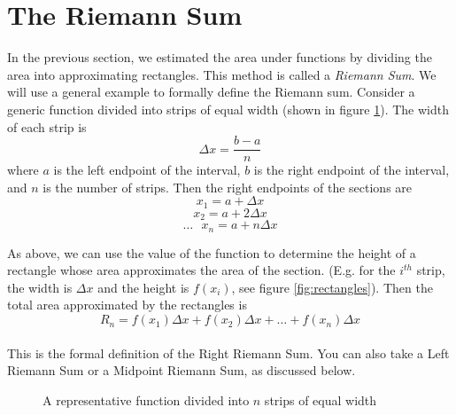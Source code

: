\section{The Riemann Sum}
In the previous section, we estimated the area under functions by dividing the area into approximating rectangles. This method is called a \textit{Riemann Sum}. We will use a general example to formally define the Riemann sum. Consider a generic function divided into strips of equal width (shown in figure \ref{fig:strips}). The width of each strip is $$\Delta x=\frac{b-a}{n}$$ where $a$ is the left endpoint of the interval, $b$ is the right endpoint of the interval, and $n$ is the number of strips. Then the right endpoints of the sections are $$x_1=a+\Delta x$$
$$x_2 = a +2\Delta x$$
$$\ldots \text{ }x_n=a+n\Delta x$$

As above, we can use the value of the function to determine the height of a rectangle whose area approximates the area of the section. (E.g. for the $i^{th}$ strip, the width is $\Delta x$ and the height is $f(x_i)$, see figure \ref{fig:rectangles}). Then the total area approximated by the rectangles is $$R_n = f(x_1)\Delta x + f(x_2)\Delta x + \ldots + f(x_n)\Delta x$$ \\This is the formal definition of the Right Riemann Sum. You can also take a Left Riemann Sum or a Midpoint Riemann Sum, as discussed below. 

\begin{figure}
\caption{A representative function divided into $n$ strips of equal width}
\label{fig:strips}
\end{figure}

